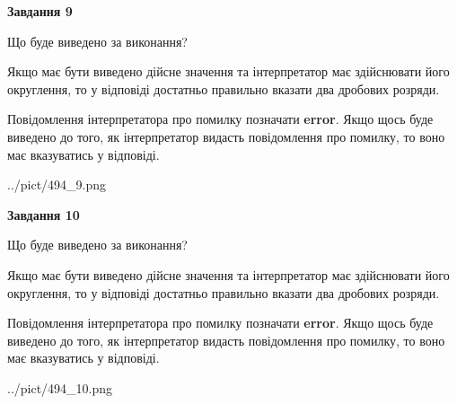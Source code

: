 \documentclass[12pt, ukrainian]{article}
\begin{document}
{\begin {Large}
{\begin {center}\textbf{Завдання 9}\end {center}}\par
Що буде виведено за виконання? \par

Якщо має бути виведено дійсне значення та інтерпретатор має здійснювати його округлення, 
то у відповіді достатньо правильно вказати два дробових розряди.

Повідомлення інтерпретатора про помилку позначати \textbf{error}.
Якщо щось буде виведено до того, як інтерпретатор видасть повідомлення про помилку, 
то воно має вказуватись у відповіді. \par

\begin{center}
	{../pict/494_9.png}
\end{center}
\newpage

{\begin {center}\textbf{Завдання 10}\end {center}}\par
Що буде виведено за виконання? \par

Якщо має бути виведено дійсне значення та інтерпретатор має здійснювати його округлення, 
то у відповіді достатньо правильно вказати два дробових розряди.

Повідомлення інтерпретатора про помилку позначати \textbf{error}.
Якщо щось буде виведено до того, як інтерпретатор видасть повідомлення про помилку, 
то воно має вказуватись у відповіді. \par

\begin{center}
	{../pict/494_10.png}
\end{center}
\newpage

\end {Large}}
\end{document}
